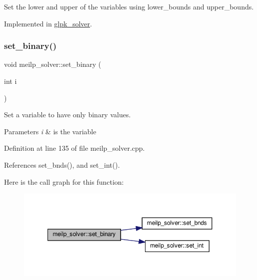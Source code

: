 Set the lower and upper of the variables using lower\+\_\+bounds and upper\+\_\+bounds. 



Implemented in \hyperlink{classglpk__solver_a452c9cc528757df64c8afd83274e5ae5}{glpk\+\_\+solver}.

\mbox{\label{classmeilp__solver_aef8ccf0980800a5b87d60b7fd030822e}} 
\subsubsection{\texorpdfstring{set\+\_\+binary()}{set\_binary()}}
{\footnotesize\ttfamily void meilp\+\_\+solver\+::set\+\_\+binary (\begin{DoxyParamCaption}\item[{int}]{i }\end{DoxyParamCaption})\hspace{0.3cm}{\ttfamily [virtual]}}



Set a variable to have only binary values. 


\begin{DoxyParams}{Parameters}
{\em i} & is the variable \\
\hline
\end{DoxyParams}


Definition at line 135 of file meilp\+\_\+solver.\+cpp.



References set\+\_\+bnds(), and set\+\_\+int().

Here is the call graph for this function\+:
\nopagebreak
\begin{figure}[H]
\begin{center}
\leavevmode
\includegraphics[width=350pt]{dc/d7f/classmeilp__solver_aef8ccf0980800a5b87d60b7fd030822e_cgraph}
\end{center}
\end{figure}
\mbox{\label{classmeilp__solver_a76c7f0f92e4a828baa788493600ed6ff}} 

